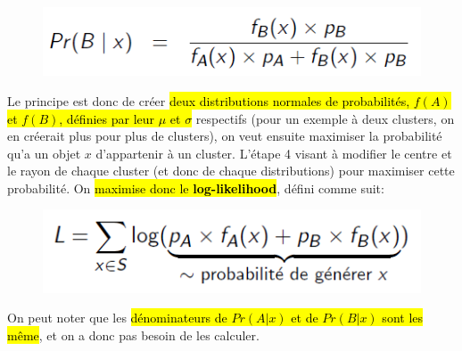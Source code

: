 \documentclass[letterpaper, 12pt]{article}
\newcommand{\alinea}{
\hspace*{0.5cm}}
\begin{document}
		\vspace*{-1.5cm}
		\begin{figure}[H]
			\centering
			\includegraphics[scale=0.65]{Images/EM_b.png}
		\end{figure}\noindent
		\alinea Le principe est donc de créer \hl{deux distributions
			normales de 
			probabilités, $f(A)$ et $f(B)$, définies par leur
			$\mu$ et $\sigma$} respectifs (pour un exemple à 
			deux clusters, on en créerait plus pour plus de
			clusters), on veut ensuite maximiser la probabilité 
			qu'a un objet $x$ d'appartenir à un cluster. 
			L'étape 4 visant à 
			modifier le centre et le rayon de chaque cluster
			(et donc de chaque distributions) pour
			maximiser cette probabilité. On \hl{maximise donc
			le \textbf{log-likelihood}}, défini comme suit:
			\begin{figure}[H]
				\centering
				\includegraphics[scale=0.65]{Images/EM_log.png}
			\end{figure}\noindent
		\alinea On peut noter que les \hl{dénominateurs de 
			$Pr(A | x)$ et de $Pr(B | x)$ sont les même}, 
			et on a donc pas besoin de les calculer.
	\newpage
\end{document}
